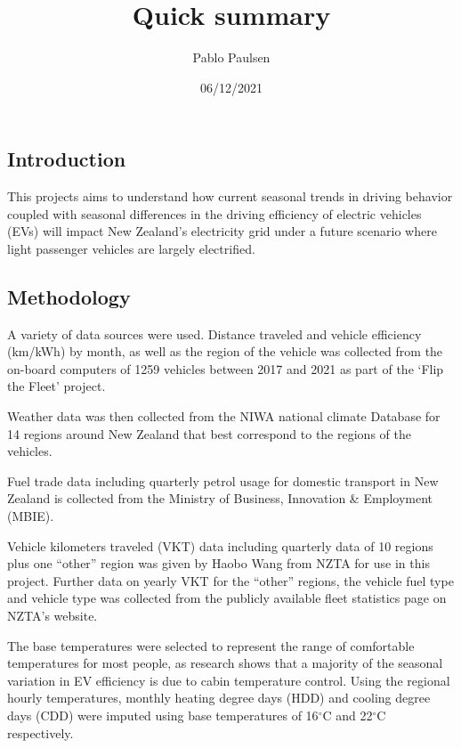 \documentclass[
]{article}
\title{Quick summary}
\author{Pablo Paulsen}
\date{06/12/2021}
\begin{document}
\maketitle

\hypertarget{introduction}{%
\subsection{Introduction}\label{introduction}}

This projects aims to understand how current seasonal trends in driving
behavior coupled with seasonal differences in the driving efficiency of
electric vehicles (EVs) will impact New Zealand's electricity grid under
a future scenario where light passenger vehicles are largely
electrified.

\hypertarget{methodology}{%
\subsection{Methodology}\label{methodology}}

A variety of data sources were used. Distance traveled and vehicle
efficiency (km/kWh) by month, as well as the region of the vehicle was
collected from the on-board computers of 1259 vehicles between 2017 and
2021 as part of the `Flip the Fleet' project.

Weather data was then collected from the NIWA national climate Database
for 14 regions around New Zealand that best correspond to the regions of
the vehicles.

Fuel trade data including quarterly petrol usage for domestic transport
in New Zealand is collected from the Ministry of Business, Innovation \&
Employment (MBIE).

Vehicle kilometers traveled (VKT) data including quarterly data of 10
regions plus one ``other'' region was given by Haobo Wang from NZTA for
use in this project. Further data on yearly VKT for the ``other''
regions, the vehicle fuel type and vehicle type was collected from the
publicly available fleet statistics page on NZTA's website.

The base temperatures were selected to represent the range of
comfortable temperatures for most people, as research shows that a
majority of the seasonal variation in EV efficiency is due to cabin
temperature control\cite{ev_range}. Using the regional hourly
temperatures, monthly heating degree days (HDD) and cooling degree days
(CDD) were imputed using base temperatures of 16\(^\circ\)C and
22\(^\circ\)C respectively.
\end{document}
